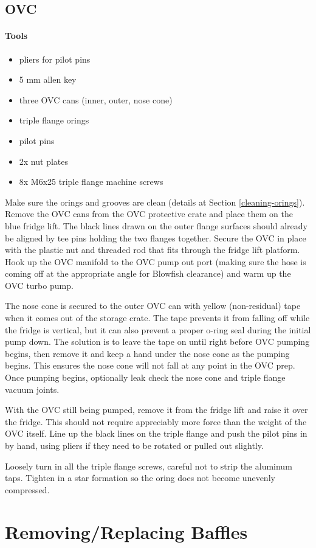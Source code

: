 \subsection{OVC}

\paragraph{Tools}
\begin{itemize}
 \item pliers for pilot pins
\item 5 mm allen key
\item three OVC cans (inner, outer, nose cone)
\item triple flange orings
\item pilot pins
\item 2x nut plates
\item 8x M6x25 triple flange machine screws
\end{itemize}

Make sure the orings and grooves are clean (details at Section \ref{cleaning-orings}).  Remove the OVC cans from the OVC protective crate and place them on the blue fridge lift.  The black lines drawn on the outer flange surfaces should already be aligned by tee pins holding the two flanges together.  Secure the OVC in place with the plastic nut and threaded rod that fits through the fridge lift platform.  Hook up the OVC manifold to the OVC pump out port (making sure the hose is coming off at the appropriate angle for Blowfish clearance) and warm up the OVC turbo pump.  

The nose cone is secured to the outer OVC can with yellow (non-residual) tape when it comes out of the storage crate.  The tape prevents it from falling off while the fridge is vertical, but it can also prevent a proper o-ring seal during the initial pump down.  The solution is to leave the tape on until right before OVC pumping begins, then remove it and keep a hand under the nose cone as the pumping begins.  This ensures the nose cone will not fall at any point in the OVC prep.  Once pumping begins, optionally leak check the nose cone and triple flange vacuum joints.

With the OVC still being pumped, remove it from the fridge lift and raise it over the fridge.  This should not require appreciably more force than the weight of the OVC itself.  Line up the black lines on the triple flange and push the pilot pins in by hand, using pliers if they need to be rotated or pulled out slightly.


Loosely turn in all the triple flange screws, careful not to strip the aluminum taps.  Tighten in a star formation so the oring does not become unevenly compressed.

\section{Removing/Replacing \het{} Baffles}